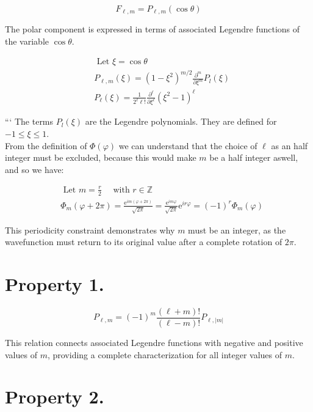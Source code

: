 \documentclass[10pt]{article}
\begin{document}
\begin{equation*}
F_{\ell, m}=P_{\ell, m}(\cos \theta) \tag{8.44}
\end{equation*}

The polar component is expressed in terms of associated Legendre functions of the variable $\cos\theta$.

\begin{align*}
& \text { Let } \xi=\cos \theta \\
& P_{\ell, m}(\xi)=\left(1-\xi^{2}\right)^{m / 2} \frac{\partial^{m}}{\partial \xi^{m}} P_{l}(\xi)  \tag{8.45}\\
& P_{\ell}(\xi)=\frac{1}{2^{\ell} \ell!} \frac{\partial^{\ell}}{\partial \xi^{\ell}}\left(\xi^{2}-1\right)^{\ell}
\end{align*}

```
The terms $P_{l}(\xi)$ are the Legendre polynomials. They are defined for $-1 \leq \xi \leq 1$.\\
From the definition of $\Phi(\varphi)$ we can understand that the choice of $\ell$ as an half integer must be excluded, because this would make $m$ be a half integer aswell, and so we have:

\begin{align*}
& \text { Let } m=\frac{r}{2} \quad \text { with } r \in \mathbb{Z} \\
& \Phi_{m}(\varphi+2 \pi)=\frac{\mathrm{e}^{i m(\varphi+2 \pi)}}{\sqrt{2 \pi}}=\frac{\mathrm{e}^{i m \varphi}}{\sqrt{2 \pi}} \mathrm{e}^{i r \varphi}=(-1)^{r} \Phi_{m}(\varphi) \tag{8.46}
\end{align*}

This periodicity constraint demonstrates why $m$ must be an integer, as the wavefunction must return to its original value after a complete rotation of $2\pi$.

\section*{Property 1.}

\begin{equation*}
P_{\ell, m}=(-1)^{m} \frac{(\ell+m)!}{(\ell-m)!} P_{\ell,|m|} \tag{8.47}
\end{equation*}

This relation connects associated Legendre functions with negative and positive values of $m$, providing a complete characterization for all integer values of $m$.

\section*{Property 2.}
\end{document}

